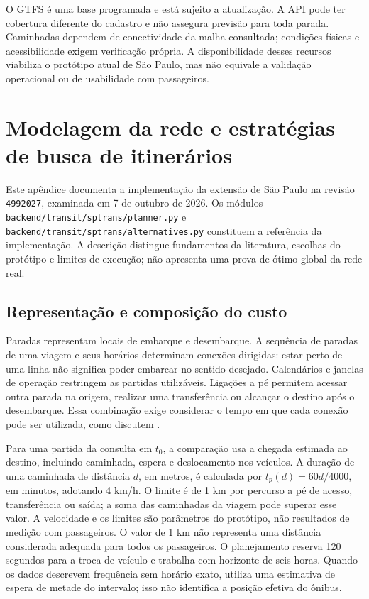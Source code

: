 \documentclass[12pt,oneside,a4paper,brazil,chapter=TITLE]{abntex2}
\let\papsection\section
\renewcommand{\section}{\clearpage\papsection}
\begin{document}
\begin{apendicesenv}
O GTFS é uma base programada e está sujeito a atualização. A API pode ter cobertura diferente do cadastro e não assegura previsão para toda parada. Caminhadas dependem de conectividade da malha consultada; condições físicas e acessibilidade exigem verificação própria. A disponibilidade desses recursos viabiliza o protótipo atual de São Paulo, mas não equivale a validação operacional ou de usabilidade com passageiros.

\chapter{Modelagem da rede e estratégias de busca de itinerários}
\label{ap:rotas}
Este apêndice documenta a implementação da extensão de São Paulo na revisão \texttt{4992027}, examinada em 7 de outubro de 2026. Os módulos \nolinkurl{backend/transit/sptrans/planner.py} e \nolinkurl{backend/transit/sptrans/alternatives.py} constituem a referência da implementação. A descrição distingue fundamentos da literatura, escolhas do protótipo e limites de execução; não apresenta uma prova de ótimo global da rede real.

\section{Representação e composição do custo}
Paradas representam locais de embarque e desembarque. A sequência de paradas de uma viagem e seus horários determinam conexões dirigidas: estar perto de uma linha não significa poder embarcar no sentido desejado. Calendários e janelas de operação restringem as partidas utilizáveis. Ligações a pé permitem acessar outra parada na origem, realizar uma transferência ou alcançar o destino após o desembarque. Essa combinação exige considerar o tempo em que cada conexão pode ser utilizada, como discutem \citet{bast2015}.

Para uma partida da consulta em $t_0$, a comparação usa a chegada estimada ao destino, incluindo caminhada, espera e deslocamento nos veículos. A duração de uma caminhada de distância $d$, em metros, é calculada por $t_p(d)=60d/4000$, em minutos, adotando 4 km/h. O limite é de 1 km por percurso a pé de acesso, transferência ou saída; a soma das caminhadas da viagem pode superar esse valor. A velocidade e os limites são parâmetros do protótipo, não resultados de medição com passageiros. O valor de 1 km não representa uma distância considerada adequada para todos os passageiros. O planejamento reserva 120 segundos para a troca de veículo e trabalha com horizonte de seis horas. Quando os dados descrevem frequência sem horário exato, utiliza uma estimativa de espera de metade do intervalo; isso não identifica a posição efetiva do ônibus.


\end{apendicesenv}
\end{document}
